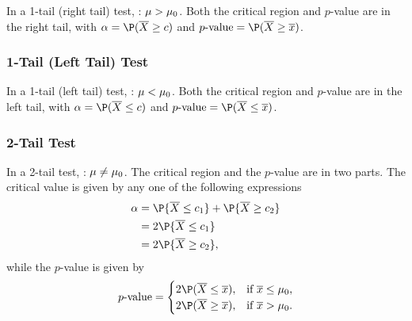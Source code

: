 In a 1-tail (right tail) test, \althyp: $\mu > \mu_0$. Both the critical region and $p$-value are in the right tail, with $\a = \P(\ol{X} \geq c)$ and $\text{$p$-value} = \P(\ol{X} \geq \ol{x})$.

\subsubsection{1-Tail (Left Tail) Test}

In a 1-tail (left tail) test, \althyp: $\mu < \mu_0$. Both the critical region and $p$-value are in the left tail, with $\a = \P(\ol{X} \leq c)$ and $\text{$p$-value} = \P(\ol{X} \leq \ol{x})$.

\subsubsection{2-Tail Test}

In a 2-tail test, \althyp: $\mu \neq \mu_0$. The critical region and the $p$-value are in two parts. The critical value is given by any one of the following expressions
\begin{align*}
    \a &= \P{\ol{X} \leq c_1} + \P{\ol{X} \geq c_2}\\
    &= 2\P{\ol{X} \leq c_1}\\
    &= 2\P{\ol{X} \geq c_2},    
\end{align*}
while the $p$-value is given by \[\text{$p$-value} = \begin{cases}2\P(\ol{X} \leq \ol{x}), & \text{if $\ol{x} \leq \m_0$}, \\ 2\P(\ol{X} \geq \ol{x}), & \text{if $\ol{x} > \m_0$}.\end{cases}\]

